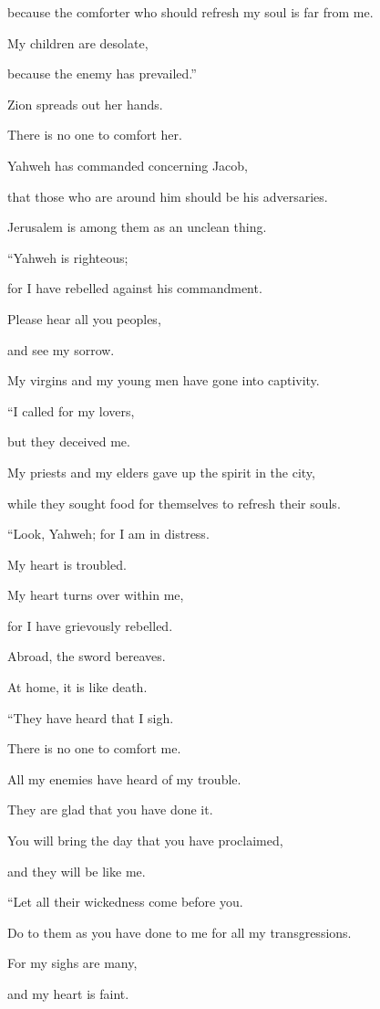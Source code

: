 {\par }{\QB because the comforter who should refresh my soul is far from me.
\par }{\Q My children are desolate,
\par }{\QB because the enemy has prevailed.”
\par }{\BB \par }{\Q {}Zion spreads out her hands.
\par }{\QB There is no one to comfort her.
\par }{\Q Yahweh has commanded concerning Jacob,
\par }{\QB that those who are around him should be his adversaries.
\par }{\QB Jerusalem is among them as an unclean thing.
\par }{\BB \par }{\Q {}“Yahweh is righteous;
\par }{\QB for I have rebelled against his commandment.
\par }{\Q Please hear all you peoples,
\par }{\QB and see my sorrow.
\par }{\QB My virgins and my young men have gone into captivity.
\par }{\BB \par }{\Q {}“I called for my lovers,
\par }{\QB but they deceived me.
\par }{\Q My priests and my elders gave up the spirit in the city,
\par }{\QB while they sought food for themselves to refresh their souls.
\par }{\BB \par }{\Q {}“Look, Yahweh; for I am in distress.
\par }{\QB My heart is troubled.
\par }{\Q My heart turns over within me,
\par }{\QB for I have grievously rebelled.
\par }{\Q Abroad, the sword bereaves.
\par }{\QB At home, it is like death.
\par }{\BB \par }{\Q {}“They have heard that I sigh.
\par }{\QB There is no one to comfort me.
\par }{\Q All my enemies have heard of my trouble.
\par }{\QB They are glad that you have done it.
\par }{\Q You will bring the day that you have proclaimed,
\par }{\QB and they will be like me.
\par }{\BB \par }{\Q {}“Let all their wickedness come before you.
\par }{\QB Do to them as you have done to me for all my transgressions.
\par }{\Q For my sighs are many,
\par }{\QB and my heart is faint.

}
